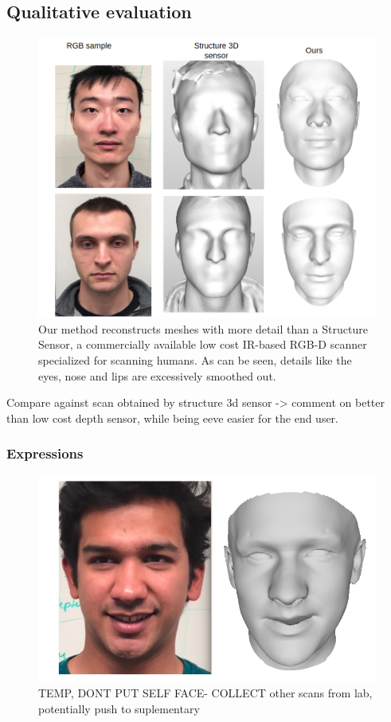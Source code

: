 \documentclass[10pt,twocolumn,letterpaper]{article}
\begin{document}
\subsection{Qualitative evaluation}
\begin{figure}[t]
\begin{center}
   \includegraphics[width=0.9\linewidth]{images/struc_3d_comp.png}
\end{center}
   \caption{Our method reconstructs meshes with more detail than a Structure Sensor, a commercially available low cost IR-based RGB-D scanner \cite{structure2019} specialized for scanning humans. As can be seen, details like the eyes, nose and lips are excessively smoothed out.}
\label{fig:long}
\label{fig:onecol}
\end{figure}

Compare against scan obtained by structure 3d sensor -> comment on better than low cost depth sensor, while being eeve easier for the end user.

\subsubsection{Expressions}

 \begin{figure}[t]
\begin{center}
   \includegraphics[width=0.8\linewidth]{images/expression_dummy.png}
\end{center}
   \caption{ TEMP, DONT PUT SELF FACE- COLLECT other scans from lab, potentially push to suplementary }
\label{fig:expressions}
\end{figure}
\end{document}
